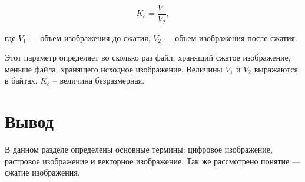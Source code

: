     \begin{equation}
    	K_c = \frac{V_1}{V_2},
    \end{equation}
    
    где \(V_1\) --- объем изображения до сжатия, \(V_2\)  --- объем изображения после сжатия.
    
    Этот параметр определяет во сколько раз файл, хранящий сжатое
изображение, меньше файла, хранящего исходное изображение. Величины \(V_1\) и
\(V_2\) выражаются в байтах. \( K_c \) – величина безразмерная.
        
    \section{Вывод}

В данном разделе определены основные термины: цифровое изображение, растровое изображение и векторное изображение. Так же 
рассмотрено понятие --- сжатие изображения.
